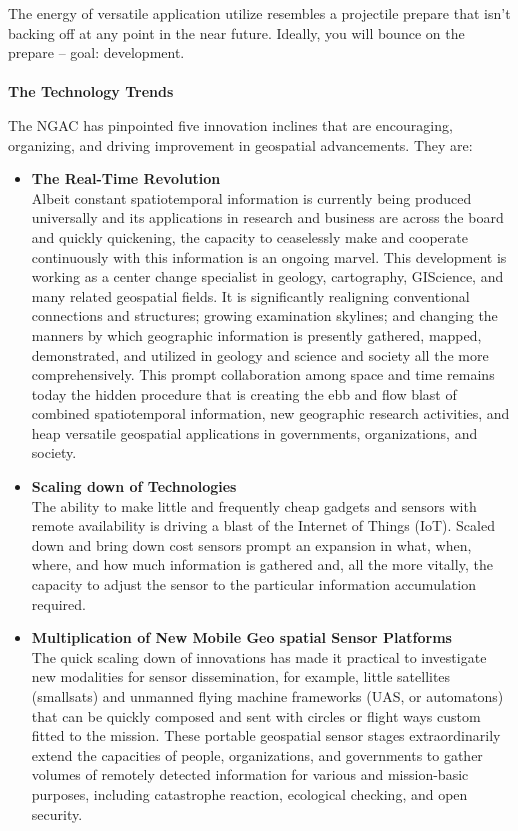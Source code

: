 The energy of versatile application utilize resembles a projectile prepare that isn't backing off at any point in the near future. Ideally, you will bounce on the prepare – goal: development. \\ \\
\textbf{The Technology Trends}

The NGAC has pinpointed five innovation inclines that are encouraging, organizing, and driving improvement in geospatial advancements. They are: 

\begin{itemize}
  \item \textbf{The Real-Time Revolution} \\
  Albeit constant spatiotemporal information is currently being produced universally and its applications in research and business are across the board and quickly quickening, the capacity to ceaselessly make and cooperate continuously with this information is an ongoing marvel. This development is working as a center change specialist in geology, cartography, GIScience, and many related geospatial fields. It is significantly realigning conventional connections and structures; growing examination skylines; and changing the manners by which geographic information is presently gathered, mapped, demonstrated, and utilized in geology and science and society all the more comprehensively. This prompt collaboration among space and time remains today the hidden procedure that is creating the ebb and flow blast of combined spatiotemporal information, new geographic research activities, and heap versatile geospatial applications in governments, organizations, and society. 
  
  \item  \textbf{Scaling down of Technologies} \\
 The ability to make little and frequently cheap gadgets and sensors with remote availability is driving a blast of the Internet of Things (IoT). Scaled down and bring down cost sensors prompt an expansion in what, when, where, and how much information is gathered and, all the more vitally, the capacity to adjust the sensor to the particular information accumulation required. 
  
  \item  \textbf{Multiplication of New Mobile Geo spatial Sensor Platforms} \\
  The quick scaling down of innovations has made it practical to investigate new modalities for sensor dissemination, for example, little satellites (smallsats) and unmanned flying machine frameworks (UAS, or automatons) that can be quickly composed and sent with circles or flight ways custom fitted to the mission. These portable geospatial sensor stages extraordinarily extend the capacities of people, organizations, and governments to gather volumes of remotely detected information for various and mission-basic purposes, including catastrophe reaction, ecological checking, and open security. 
  

\end{itemize}
